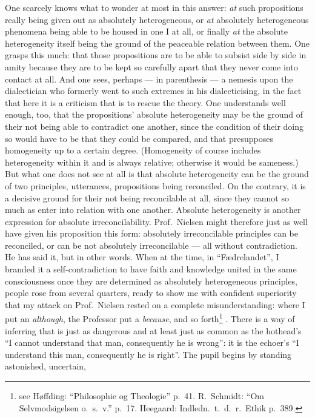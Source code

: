 \documentclass[12pt,a4paper]{book}
\renewcommand{\thefootnote}{*)}
\newcommand{\fnmark}[2]{\renewcommand{\thefootnote}{#1}\footnote{#2}%
  \renewcommand{\thefootnote}{*)}}
\newcommand{\opage}[1]{\marginnote{\footnotesize\textit{[#1]}}}
\begin{document}
One scarcely knows what to wonder at most in this answer: \emph{at} such
propositions really being given out as absolutely heterogeneous, or \emph{at}
absolutely heterogeneous phenomena being able to be housed in one I at all, or
finally \emph{at} the absolute heterogeneity itself being the ground of the
peaceable relation between them. One grasps this much: that those propositions
are to be able to subsist side by side in amity because they are to be kept so
carefully apart that they never come into contact at all. And one sees,
perhaps --- in parenthesis --- a nemesis upon the dialectician who formerly
went to such extremes in his dialecticising, in the fact that here it is a
criticism that is to rescue the theory. One understands
\opage{32}well enough, too, that the propositions' absolute heterogeneity may
be the ground of their not being able to contradict one another, since the
condition of their doing so would have to be that they could be compared, and
that presupposes homogeneity up to a certain degree. (Homogeneity of course
includes heterogeneity within it and is always relative; otherwise it would be
sameness.) But what one does not see at all is that absolute heterogeneity can
be the ground of two principles, utterances, propositions being reconciled. On
the contrary, it is a decisive ground for their not being reconcilable at all,
since they cannot so much as enter into relation with one another. Absolute
heterogeneity is another expression for absolute irreconcilability. Prof.\
Nielsen might therefore just as well have given his proposition this form:
absolutely irreconcilable principles can be reconciled, or can be not
absolutely irreconcilable --- all without contradiction. He has said it, but in
other words. When at the time, in ``Fædrelandet'', I branded it a
self-contradiction to have faith and knowledge united in the same consciousness
once they are determined as absolutely heterogeneous principles, people rose
from several quarters, ready to show me with confident superiority that my
attack on Prof.\ Nielsen rested on a complete misunderstanding: where I put an
\emph{although}, the Professor put a \emph{because}, and so
forth\fnmark{*)}{see Høffding: ``Philosophie og Theologie'' p.\ 41. R.\ Schmidt:
``Om Selvmodsigelsen o.\ s.\ v.'' p.\ 17. Heegaard: Indledn.\ t.\ d.\ r.\
Ethik p.\ 389.}. There is a way of inferring that is just as dangerous and at
least just
\opage{33}as common as the hothead's ``I cannot understand that man,
consequently he is wrong'': it is the echoer's ``I understand this man,
consequently he is right''. The pupil begins by standing astonished, uncertain,
\end{document}
